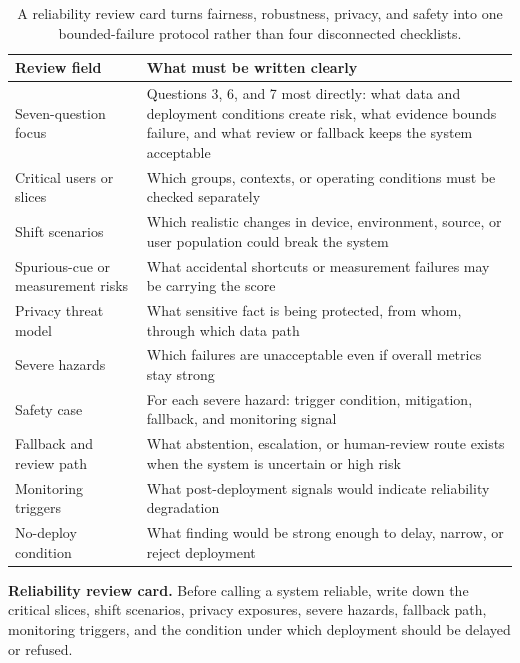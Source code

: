 \begin{table}[t]
\centering
\small
\setlength{\tabcolsep}{4pt}
\begin{tabular}{p{3.25cm}p{6.98cm}}
\toprule
Review field & What must be written clearly \\
\midrule
Seven-question focus & Questions 3, 6, and 7 most directly: what data and deployment conditions create risk, what evidence bounds failure, and what review or fallback keeps the system acceptable \\
Critical users or slices & Which groups, contexts, or operating conditions must be checked separately \\
Shift scenarios & Which realistic changes in device, environment, source, or user population could break the system \\
Spurious-cue or measurement risks & What accidental shortcuts or measurement failures may be carrying the score \\
Privacy threat model & What sensitive fact is being protected, from whom, through which data path \\
Severe hazards & Which failures are unacceptable even if overall metrics stay strong \\
Safety case & For each severe hazard: trigger condition, mitigation, fallback, and monitoring signal \\
Fallback and review path & What abstention, escalation, or human-review route exists when the system is uncertain or high risk \\
Monitoring triggers & What post-deployment signals would indicate reliability degradation \\
No-deploy condition & What finding would be strong enough to delay, narrow, or reject deployment \\
\bottomrule
\end{tabular}
\caption{A reliability review card turns fairness, robustness, privacy, and safety into one bounded-failure protocol rather than four disconnected checklists.}
\label{tab:reliability-review-card}
\end{table}

\begin{thinkingtool}
\textbf{Reliability review card.} Before calling a system reliable, write down the critical slices, shift scenarios, privacy exposures, severe hazards, fallback path, monitoring triggers, and the condition under which deployment should be delayed or refused.
\end{thinkingtool}

